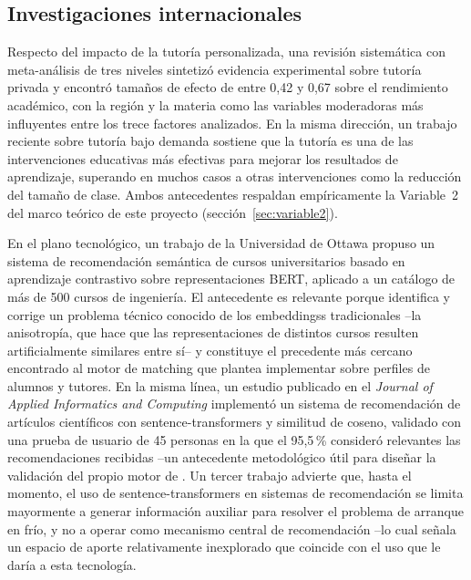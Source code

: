 \subsection{Investigaciones internacionales}

Respecto del impacto de la tutoría personalizada, una revisión
sistemática con meta-análisis de tres niveles \citep{sciencedirect2022}
sintetizó evidencia experimental sobre tutoría privada y encontró
tamaños de efecto de entre 0,42 y 0,67 sobre el rendimiento académico,
con la región y la materia como las variables moderadoras más
influyentes entre los trece factores analizados. En la misma dirección,
un trabajo reciente sobre tutoría bajo demanda \citep{ondemand2026}
sostiene que la tutoría es una de las intervenciones educativas más
efectivas para mejorar los resultados de aprendizaje, superando en
muchos casos a otras intervenciones como la reducción del tamaño de
clase. Ambos antecedentes respaldan empíricamente la Variable~2 del
marco teórico de este proyecto (sección~\ref{sec:variable2}).

En el plano tecnológico, un trabajo de la Universidad de Ottawa
\citep{isotropy2026} propuso un sistema de recomendación semántica de
cursos universitarios basado en aprendizaje contrastivo sobre
representaciones BERT, aplicado a un catálogo de más de 500 cursos de
ingeniería. El antecedente es relevante porque identifica y corrige un
problema técnico conocido de los \glspl{embeddings} tradicionales --la
anisotropía, que hace que las representaciones de distintos cursos
resulten artificialmente similares entre sí-- y constituye el precedente
más cercano encontrado al motor de \gls{matching} que \sistema{} plantea
implementar sobre perfiles de alumnos y tutores. En la misma línea, un
estudio publicado en el \emph{Journal of Applied Informatics and
Computing} \citep{paperrec2025} implementó un sistema de recomendación de
artículos científicos con sentence-transformers y similitud de coseno,
validado con una prueba de usuario de 45 personas en la que el 95,5\,\%
consideró relevantes las recomendaciones recibidas --un antecedente
metodológico útil para diseñar la validación del propio motor de
\sistema{}. Un tercer trabajo \citep{beefore2024} advierte que, hasta el
momento, el uso de sentence-transformers en sistemas de recomendación se
limita mayormente a generar información auxiliar para resolver el
problema de arranque en frío, y no a operar como mecanismo central de
recomendación --lo cual señala un espacio de aporte relativamente
inexplorado que coincide con el uso que \sistema{} le daría a esta
tecnología.

